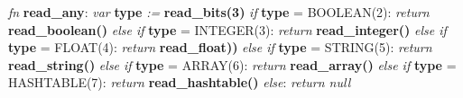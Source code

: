 \begin{changemargin}{-60mm}{0mm}
\begin{myquote}

\vbox{
\textit{fn} \textbf{read\_any}: \newline
\indent\hspace{.5cm} \textit{var} \textbf{type} \textit{:=} \textbf{read\_bits(3)} \newline
\indent\hspace{.5cm} \textit{if} \textbf{type} = BOOLEAN(2): \newline
\indent\hspace{1cm} \textit{return} \textbf{read\_boolean()} \newline
\indent\hspace{.5cm} \textit{else if} \textbf{type} = INTEGER(3): \newline
\indent\hspace{1cm} \textit{return} \textbf{read\_integer()} \newline
\indent\hspace{.5cm} \textit{else if} \textbf{type} = FLOAT(4): \newline
\indent\hspace{1cm} \textit{return} \textbf{read\_float))} \newline
\indent\hspace{.5cm} \textit{else if} \textbf{type} = STRING(5): \newline
\indent\hspace{1cm} \textit{return} \textbf{read\_string()} \newline
\indent\hspace{.5cm} \textit{else if} \textbf{type} = ARRAY(6): \newline
\indent\hspace{1cm} \textit{return} \textbf{read\_array()} \newline
\indent\hspace{.5cm} \textit{else if} \textbf{type} = HASHTABLE(7): \newline
\indent\hspace{1cm} \textit{return} \textbf{read\_hashtable()} \newline
\indent\hspace{.5cm} \textit{else}: \newline
\indent\hspace{1cm} \textit{return null} \newline
}

\end{myquote}
\end{changemargin}

